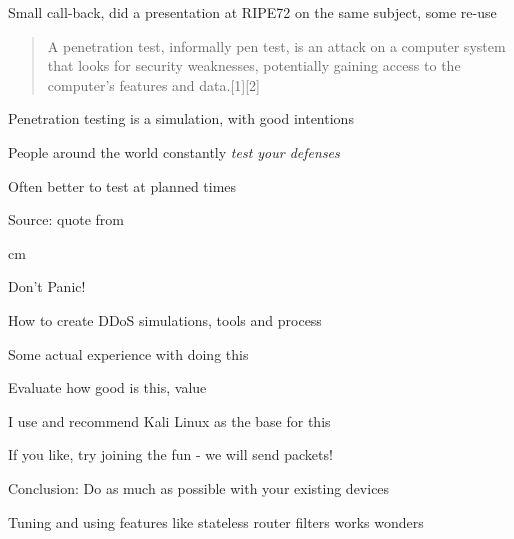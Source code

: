 \documentclass[Screen16to9,17pt]{foils}
\begin{document}


Small call-back, did a presentation at RIPE72 on the same subject, some re-use\\

\hlkprofiluk


\begin{quote}
A penetration test, informally pen test, is an attack on a computer system that looks for security weaknesses, potentially gaining access to the computer's features and data.[1][2]
\end{quote}

\begin{list1}
\item Penetration testing is a simulation, with good intentions
\item People around the world constantly \emph{test your defenses}
\item Often better to test at planned times
\end{list1}

Source: quote from 



 cm

\centerline{\color{titlecolor}\LARGE Don't Panic!}

\begin{list1}
\item How to create DDoS simulations, tools and process
\item Some actual experience with doing this
\item Evaluate how good is this, value
\item I use and recommend Kali Linux as the base for this
\item If you like, try joining the fun - we will send packets!
\end{list1}



\begin{list1}
\item Conclusion: Do as much as possible with your existing devices
\item Tuning and using features like stateless router filters works wonders
\end{list1}
\end{document}
